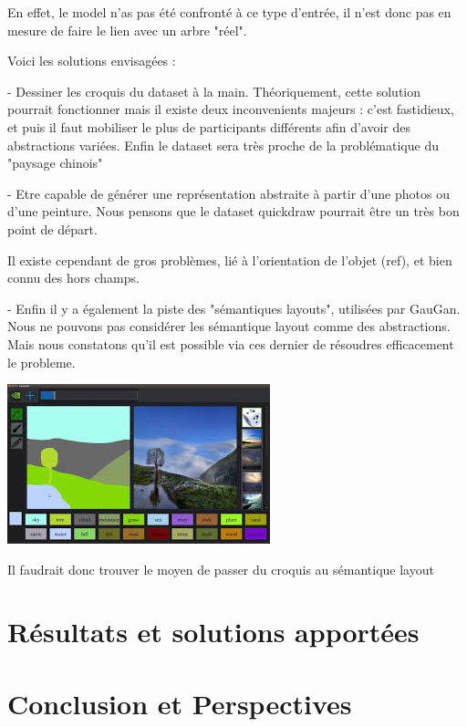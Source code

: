 \documentclass[a4paper, 12pt]{book}
\begin{document}
En effet, le model n'as pas été confronté à ce type d'entrée, il n'est donc pas en mesure de faire le lien avec un arbre "réel". 

Voici les solutions envisagées  :
 
- Dessiner les croquis du dataset à la main. Théoriquement, cette solution pourrait fonctionner mais il existe deux inconvenients majeurs : c'est fastidieux, et puis il faut mobiliser le plus de participants différents afin d'avoir des abstractions variées. Enfin le dataset sera très proche de la problématique du "paysage chinois"

- Etre capable de générer une représentation abstraite à partir d'une photos ou d'une peinture. Nous pensons que le dataset quickdraw pourrait être un très bon point de départ.

Il existe cependant de gros problèmes, lié à l'orientation de l'objet (ref), et bien connu des hors champs.

- Enfin il y a également la piste des "sémantiques layouts", utilisées par GauGan. Nous ne pouvons pas considérer les sémantique layout comme des abstractions. Mais nous constatons qu'il est possible via ces dernier de résoudres efficacement le probleme.

\includegraphics[width=0.5\linewidth]{images/gaugan-abs-ex.jpeg}

Il faudrait donc trouver le moyen de passer du croquis au sémantique layout


\chapter{Résultats et solutions apportées}


\chapter{Conclusion et Perspectives\label{chap-conclusion}}



\end{document}

